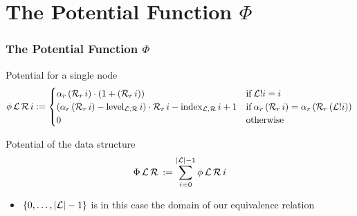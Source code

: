 \section{The Potential Function $\Phi$}
\begin{frame}
	\frametitle{The Potential Function $\Phi$}	
	\vspace{0.6cm}
	\begin{definition}{Potential for a single node}
		\begin{equation*}
		\phi\, \mathcal{L}\, \mathcal{R}\, i :=
		\begin{cases}
		\alpha_r\, (\mathcal{R}_r\, i) \cdot (1 + (\mathcal{R}_r\, i)) & \mathrm{if}\, \mathcal{L}!i=i \,   \\
		(\alpha_r\, (\mathcal{R}_r\, i) - \mathrm{level}_{\mathcal{L},\mathcal{R}}\, i) \cdot \mathcal{R}_r\, i - \mathrm{index}_{\mathcal{L},\mathcal{R}}\, i + 1  &\mathrm{if}\, \alpha_r\, (\mathcal{R}_r\, i) = \alpha_r\, (\mathcal{R}_r\, (\mathcal{L}!i))\\
		0 & \mathrm{otherwise}
		\end{cases}
		\end{equation*}
	\end{definition}

\begin{definition}{Potential of the data structure}
	\begin{equation}
	\Phi\, \mathcal{L}\, \mathcal{R}\, :=  \sum_{i = 0}^{|\mathcal{L}| - 1}{\phi\, \mathcal{L}\, \mathcal{R}\, i}
	\end{equation}
\end{definition}

\begin{itemize}
	\item $\{0,\dots, |\mathcal{L}|-1\}$ is in this case the domain of our equivalence relation
\end{itemize}

	
\end{frame}


